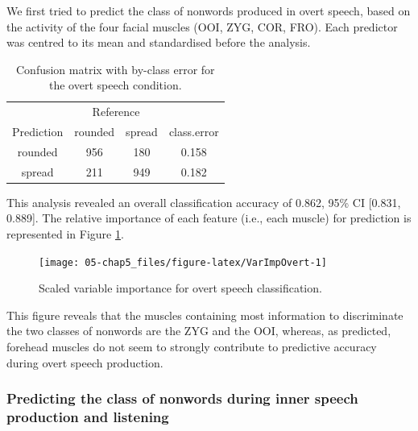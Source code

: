 \documentclass[a4paper,12pt,twoside,onecolumn,openright,final,oldfontcommands]{memoir}
\begin{document}
We first tried to predict the class of nonwords produced in overt speech, based on the activity of the four facial muscles (OOI, ZYG, COR, FRO). Each predictor was centred to its mean and standardised before the analysis.

\begin{table}[H]
\begin{center}
\begin{threeparttable}
\caption{\label{tab:CMovert}Confusion matrix with by-class error for the overt speech condition.}
\begin{tabular}{cccc}
\toprule
 & \multicolumn{2}{c}{Reference}  &\\
\cmidrule(r){2-3}
Prediction & \multicolumn{1}{c}{rounded} & \multicolumn{1}{c}{spread} & \multicolumn{1}{c}{class.error}\\
\midrule
rounded & 956 & 180 & 0.158\\
spread & 211 & 949 & 0.182\\
\bottomrule
\end{tabular}
\end{threeparttable}
\end{center}
\end{table}

This analysis revealed an overall classification accuracy of 0.862, 95\% CI {[}0.831, 0.889{]}. The relative importance of each feature (i.e., each muscle) for prediction is represented in Figure \ref{fig:VarImpOvert}.

\begin{figure}[ht]

{\centering \texttt{[image: 05-chap5\_files/figure-latex/VarImpOvert-1]} 

}

\caption{Scaled variable importance for overt speech classification.}\label{fig:VarImpOvert}
\end{figure}

This figure reveals that the muscles containing most information to discriminate the two classes of nonwords are the ZYG and the OOI, whereas, as predicted, forehead muscles do not seem to strongly contribute to predictive accuracy during overt speech production.

\hypertarget{predicting-the-class-of-nonwords-during-inner-speech-production-and-listening}{%
\subsubsection{Predicting the class of nonwords during inner speech production and listening}\label{predicting-the-class-of-nonwords-during-inner-speech-production-and-listening}}
\end{document}
